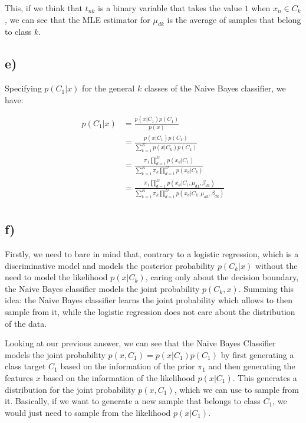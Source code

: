 \documentclass[12pt,a4paper,oneside]{paper}
\begin{document}
This, if we think that $t_{nk}$ is a binary variable that takes the value $1$ when $x_n \in C_k$, we can see that the MLE estimator for $\mu_{dk}$ is the average of samples that belong to class $k$.

\subsection*{e)}

Specifying $p(C_1 | x)$ for the general $k$ classes of the Naive Bayes classifier, we have:

\begin{align*}
    p(C_1 | x) &= \frac{p(x | C_1) p(C_1)}{p(x)} \\
    &= \frac{p(x | C_1) p(C_1)}{\sum_{k=1}^{K} p(x | C_k) p(C_k)} \\
    &= \frac{\pi_1 \prod_{d=1}^{D} p(x_d | C_1)}{\sum_{k=1}^{K} \pi_k \prod_{d=1}^{D} p(x_d | C_k)} \\
    &= \frac{\pi_1 \prod_{d=1}^{D} p(x_d | C_1, \mu_{d1}, \beta_{d1})}{\sum_{k=1}^{K} \pi_k \prod_{d=1}^{D} p(x_d | C_k, \mu_{dk}, \beta_{dk})} \\
\end{align*}

\subsection*{f)}

Firstly, we need to bare in mind that, contrary to a logistic regression, which is a discriminative model and
models the posterior probability $p(C_k | x)$ without the need to model the likelihood $p(x | C_k)$, caring only about the decision boundary, the Naive Bayes
classifier models the joint probability $p(C_k, x)$. Summing this idea: the Naive Bayes classifier learns the joint probability
which allows to then sample from it, while the logistic regression does not care about the distribution of the data. 

Looking at our previous answer, we can see that the Naive Bayes Classifier models the joint probability
$p(x, C_1) = p(x | C_1) p(C_1)$ by first generating a class target $C_1$ based on the information of the prior $\pi_1$ and
then generating the features $x$ based on the information of the likelihood $p(x | C_1)$. This generates a distribution
for the joint probability $p(x, C_1)$, which we can use to sample from it. Basically, if we want to generate a new sample
that belongs to class $C_1$, we would just need to sample from the likelihood $p(x | C_1)$. 
\end{document}

